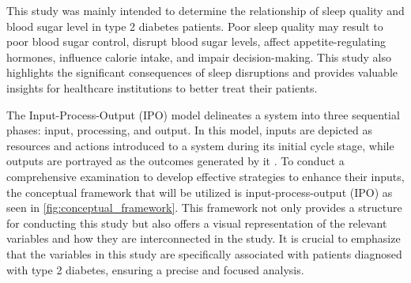 
This study was mainly intended to determine the relationship of sleep quality
and blood sugar level in type 2 diabetes patients. Poor sleep quality may result
to poor blood sugar control, disrupt blood sugar levels, affect
appetite-regulating hormones, influence calorie intake, and impair
decision-making. This study also highlights the significant consequences of sleep
disruptions and provides valuable insights for healthcare institutions to better
treat their patients.

The Input-Process-Output (IPO) model delineates a system into three sequential
phases: input, processing, and output. In this model, inputs are depicted as
resources and actions introduced to a system during its initial cycle
stage, while outputs are portrayed as the outcomes generated by it
\parencite{maccuspie-2014}. To conduct a comprehensive examination to develop
effective strategies to enhance their inputs, the conceptual framework that will
be utilized is input-process-output (IPO) as seen in
\cref{fig:conceptual_framework}. This framework not only provides a structure
for conducting this study but also offers a visual representation of the
relevant variables and how they are interconnected in the study. It is crucial
to emphasize that the variables in this study are specifically associated with
patients diagnosed with type 2 diabetes, ensuring a precise and
focused analysis.

